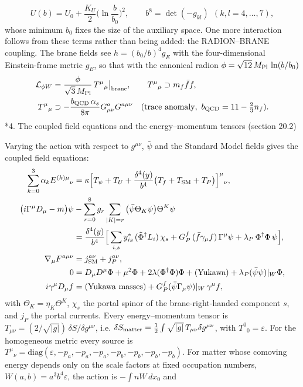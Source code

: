 \documentclass[10pt,a4paper]{article}
\makeatletter
\renewcommand\section{\@startsection{section}{1}{\z@}{-3.5ex \@plus -1ex \@minus -.2ex}{2.3ex \@plus.2ex}{\normalfont\Large\bfseries\raggedright}}
\makeatother
\begin{document}
\begin{equation*}
U(b)=U_0+\frac{K_U}{2}\Big(\ln\frac{b}{b_0}\Big)^2,\qquad b^8=\det(-g_{kl})\ \ (k,l=4,\dots,7),
\end{equation*}
whose minimum $b_0$ fixes the size of the auxiliary space. One more interaction follows from these terms rather than being added: the RADION–BRANE coupling. The brane fields see $h=(b_0/b)^4g_E$ with the four-dimensional Einstein-frame metric $g_E$, so that with the canonical radion $\phi=\sqrt{12}\,M_{\rm Pl}\,\ln(b/b_0)$
\begin{align*}
\mathcal L_{\phi W}&=\frac{\phi}{\sqrt3\,M_{\rm Pl}}\,T^\mu{}_\mu\big|_{\rm brane},\qquad T^\mu{}_\mu\supset m_f\bar ff, \\
T^\mu{}_\mu&\supset-\frac{b_{\rm QCD}\,\alpha_s}{8\pi}G^a_{\mu\nu}G^{a\mu\nu}\quad(\text{trace anomaly},\ b_{\rm QCD}=11-\tfrac23n_f).
\end{align*}
\section*{4. The coupled field equations and the energy–momentum tensors (section 20.2)}
Varying the action with respect to $g^{\mu\nu}$, $\bar\psi$ and the Standard Model fields gives the coupled field equations:
\begin{align*}
\sum_{k=0}^{3}\alpha_kE^{(k)\mu}{}_\nu&=\kappa\Big[T_\psi+T_U+\frac{\delta^4(y)}{b^4}\big(T_f+T_{\rm SM}+T_P\big)\Big]^\mu{}_\nu, \\
\big(i\Gamma^\mu D_\mu-m\big)\psi&-\sum_{r=0}^{8}g_r\sum_{|K|=r}\big(\bar\psi\Theta_K\psi\big)\Theta^K\psi \\
&=\frac{\delta^4(y)}{b^4}\Big[\sum_{i,s}y^*_{is}\,(\tilde\Phi^\dagger L_i)\,\chi_s+G_P^f\,(\bar f\gamma_\mu f)\,\Gamma^\mu\psi+\lambda_P\,\Phi^\dagger\Phi\,\psi\Big], \\
\nabla_\mu F^{a\mu\nu}&=j^{a\nu}_{\rm SM}+j^{a\nu}_P, \\
0&=D_\mu D^\mu\Phi+\mu^2\Phi+2\lambda(\Phi^\dagger\Phi)\Phi+(\text{Yukawa})+\lambda_P(\bar\psi\psi)|_W\Phi, \\
i\gamma^\mu D_\mu f&=(\text{Yukawa masses})+G_P^f(\bar\psi\Gamma_\mu\psi)|_W\,\gamma^\mu f,
\end{align*}
with $\Theta_K=\eta_K\Theta^K$, $\chi_s$ the portal spinor of the brane-right-handed component $s$, and $j_P$ the portal currents. Every energy–momentum tensor is $T_{\mu\nu}=(2/\sqrt{|g|})\,\delta S/\delta g^{\mu\nu}$, i.e. $\delta S_{\rm matter}=\tfrac12\int\sqrt{|g|}\,T_{\mu\nu}\delta g^{\mu\nu}$, with $T^0{}_0=\varepsilon$. For the homogeneous metric every source is $T^\mu{}_\nu=\mathrm{diag}(\varepsilon,-p_a,-p_a,-p_a,-p_b,-p_b,-p_b,-p_b)$. For matter whose comoving energy depends only on the scale factors at fixed occupation numbers, $W(a,b)=a^3b^4\varepsilon$, the action is $-\int nW\,dx_0$ and
\end{document}
